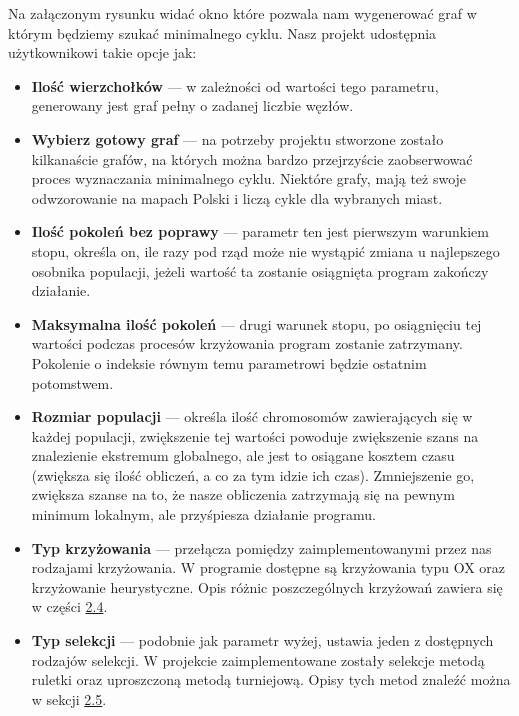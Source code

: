 \documentclass[a4paper]{article}
\begin{document}
Na załączonym rysunku widać okno które pozwala nam wygenerować graf w którym będziemy szukać minimalnego cyklu. Nasz projekt udostępnia użytkownikowi takie opcje jak:
\begin{itemize}
 \item \textbf{Ilość wierzchołków} --- w zależności od wartości tego parametru, generowany jest graf pełny o zadanej liczbie węzłów.

 \item \textbf{Wybierz gotowy graf} --- na potrzeby projektu stworzone zostało kilkanaście grafów, na których można bardzo przejrzyście zaobserwować proces wyznaczania minimalnego cyklu. Niektóre grafy, mają też swoje odwzorowanie na mapach Polski i liczą cykle dla wybranych miast.

 \item \textbf{Ilość pokoleń bez poprawy} --- parametr ten jest pierwszym warunkiem stopu, określa on, ile razy pod rząd może nie wystąpić zmiana u najlepszego osobnika populacji, jeżeli wartość ta zostanie osiągnięta program zakończy działanie.

 \item \textbf{Maksymalna ilość pokoleń} --- drugi warunek stopu, po osiągnięciu tej wartości podczas procesów krzyżowania program zostanie zatrzymany. Pokolenie o indeksie równym temu parametrowi będzie ostatnim potomstwem.

 \item \textbf{Rozmiar populacji} --- określa ilość chromosomów zawierających się w każdej populacji, zwiększenie tej wartości powoduje zwiększenie szans na znalezienie ekstremum globalnego, ale jest to osiągane kosztem czasu (zwiększa się ilość obliczeń, a co za tym idzie ich czas). Zmniejszenie go, zwiększa szanse na to, że nasze obliczenia zatrzymają się na pewnym minimum lokalnym, ale przyśpiesza działanie programu.

 \item \textbf{Typ krzyżowania} --- przełącza pomiędzy zaimplementowanymi przez nas rodzajami krzyżowania. W programie dostępne są krzyżowania typu OX oraz krzyżowanie heurystyczne. Opis różnic poszczególnych krzyżowań zawiera się w części \hyperlink{krzyzowanie}{2.4}.

 \item \textbf{Typ selekcji} --- podobnie jak parametr wyżej, ustawia jeden z dostępnych rodzajów selekcji. W projekcie zaimplementowane zostały selekcje metodą ruletki oraz uproszczoną metodą turniejową. Opisy tych metod znaleźć można w sekcji \hyperlink{selekcja}{2.5}.


\end{itemize}
\end{document}
